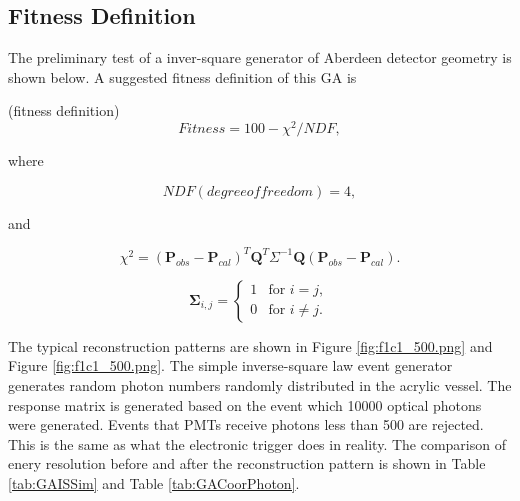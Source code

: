 \subsection{Fitness Definition}

The preliminary test of a inver-square generator of Aberdeen
detector geometry is shown below. A suggested fitness definition of this GA is


(fitness definition)
\begin{equation}
\label{fitness}
Fitness = 100 - \chi^{2}/NDF,
\end{equation}


where


\begin{equation}
\label{eq:fitnessNDF}
NDF(degree of freedom) = 4,
\end{equation}


and


\begin{equation}
\label{eq:fitnessChi}
\chi^{2} = (\mathbf{P}_{obs} - \mathbf{P}_{cal})^T\mathbf{Q}^T\Sigma^{-1}\mathbf{Q}(\mathbf{P}_{obs} - \mathbf{P}_{cal}).
\end{equation}



\begin{equation}
\label{eq:covariance1}
\mathbf{\Sigma}_{i,j} =
\left\{
    \begin{array}{ll}
    1 & \mbox{for } i=j, \\
    0 & \mbox{for } i{\neq}j.
    \end{array} \right.
\end{equation}



%
%
%
%
%
%

The typical reconstruction patterns are shown in Figure \ref{fig:f1c1_500.png} and Figure \ref{fig:f1c1_500.png}.
The simple inverse-square law event generator generates random photon numbers randomly distributed in the acrylic vessel.
The response matrix is generated based on the event which 10000 optical photons were generated.
Events that PMTs receive photons less than 500 are rejected. This is the same as what the electronic trigger does in reality.
The comparison of enery resolution before and after the reconstruction pattern is shown in Table \ref{tab:GAISSim} and Table \ref{tab:GACoorPhoton}.



